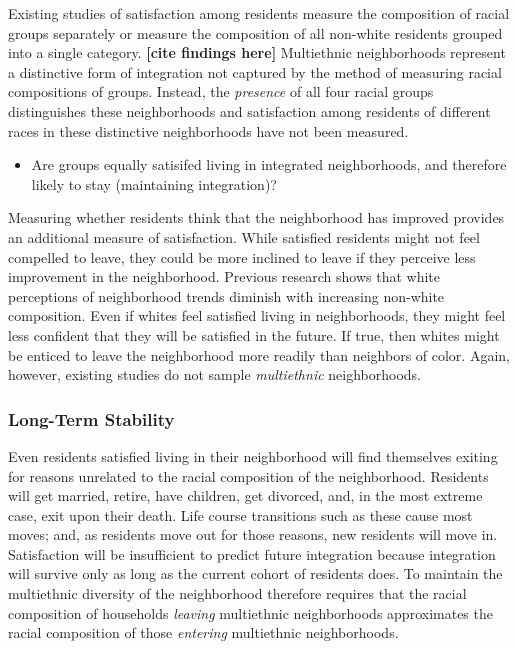 \documentclass{baderart}
\providecommand{\tightlist}{%
  \setlength{\itemsep}{0pt}\setlength{\parskip}{0pt}}
\begin{document}
Existing studies of satisfaction among residents measure the composition of racial groups separately or measure the composition of all non-white residents grouped into a single category. \textbf{{[}cite findings here{]}} Multiethnic neighborhoods represent a distinctive form of integration not captured by the method of measuring racial compositions of groups. Instead, the \emph{presence} of all four racial groups distinguishes these neighborhoods and satisfaction among residents of different races in these distinctive neighborhoods have not been measured.

\begin{itemize} \tightlist \item   Are groups equally satisifed living in integrated neighborhoods, and   therefore likely to stay (maintaining integration)? \end{itemize}

Measuring whether residents think that the neighborhood has improved provides an additional measure of satisfaction. While satisfied residents might not feel compelled to leave, they could be more inclined to leave if they perceive less improvement in the neighborhood. Previous research shows that white perceptions of neighborhood trends diminish with increasing non-white composition. Even if whites feel satisfied living in neighborhoods, they might feel less confident that they will be satisfied in the future. If true, then whites might be enticed to leave the neighborhood more readily than neighbors of color. Again, however, existing studies do not sample \emph{multiethnic} neighborhoods.

\subsubsection{Long-Term Stability}\label{long-term-stability}

Even residents satisfied living in their neighborhood will find themselves exiting for reasons unrelated to the racial composition of the neighborhood. Residents will get married, retire, have children, get divorced, and, in the most extreme case, exit upon their death. Life course transitions such as these cause most moves; and, as residents move out for those reasons, new residents will move in. Satisfaction will be insufficient to predict future integration because integration will survive only as long as the current cohort of residents does. To maintain the multiethnic diversity of the neighborhood therefore requires that the racial composition of households \emph{leaving} multiethnic neighborhoods approximates the racial composition of those \emph{entering} multiethnic neighborhoods.
\end{document}
